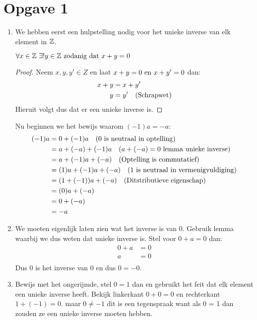 \documentclass{article}
\begin{document}
\section*{Opgave 1}
\begin{enumerate}[label=\alph*)]
    \item We hebben eerst een hulpstelling nodig voor het unieke inverse van elk element in $\mathbb{Z}$.
          \begin{lemma}
              \(\forall x \in \mathbb{Z} \ \exists ! y \in \mathbb{Z} \text{ zodanig dat } x + y = 0 \)
              \begin{proof}
                  Neem \(x, y, y' \in Z \) en laat \( x + y = 0 \text{ en } x + y' = 0\) dan:
                  \begin{align*}
                      x + y & = x + y'                    \\
                      y     & = y' \quad (\text{Schrapwet})
                  \end{align*}
                  Hieruit volgt dus dat er een unieke inverse is.
              \end{proof}
          \end{lemma}
          Nu beginnen we het bewijs waarom $(-1)a = -a$:
          \begin{align*}
              (-1)a & = 0 + (-1)a \quad (0 \tx{ is neutraal in optelling})                   \\
                    & = a + (-a) + (-1)a \quad (a + (-a) = 0 \ \tx{lemma unieke inverse})    \\
                    & = a + (-1)a + (-a) \quad (\tx{Optelling is commutatief})               \\
                    & = (1)a + (-1)a + (-a) \quad (1 \tx{ is neutraal in vermenigvuldiging}) \\
                    & = (1 + (-1))a + (-a) \quad (\tx{Ditstributieve eigenschap})            \\
                    & = (0)a + (-a)                                                          \\
                    & = 0 + (-a)                                                             \\
                    & = -a
          \end{align*}

    \item
          We moeten eigenlijk laten zien wat het inverse is van $0$.
          Gebruik lemma waarbij we dus weten dat unieke inverse is.
          Stel voor $0 + a = 0$ dan:
          \begin{align*}
              0 + a & = 0 \\
              a     & = 0 \\
          \end{align*}
          Dus $0$ is het inverse van $0$ en dus $0 = -0$.
    \item
          Bewijs met het ongerijmde, stel $0 = 1$ dan en gebruikt het feit dat elk element
          een unieke inverse heeft. Bekijk linkerkant $ 0 + 0 = 0$ en rechterkant $1 + (-1) = 0$.
          maar $0 \neq -1$ dit is een tegenspraak want als 0 = 1 dan zouden ze een unieke inverse moeten hebben.
\end{enumerate}
\end{document}
